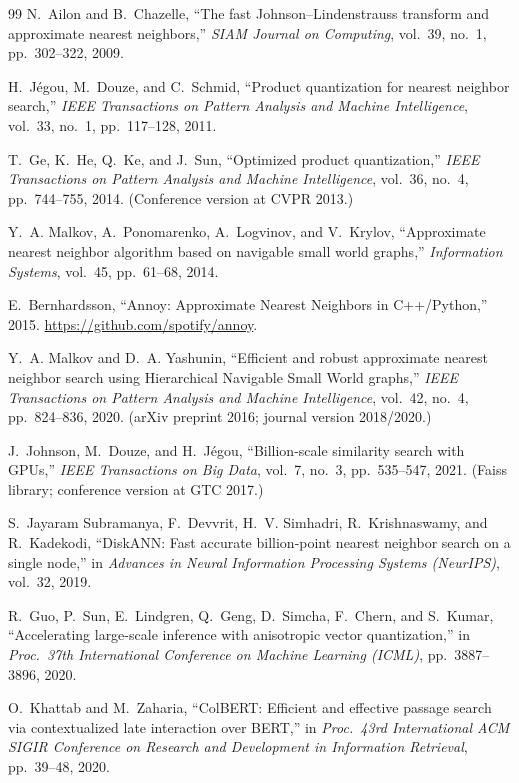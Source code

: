 \documentclass[11pt,a4paper]{article}
\theoremstyle{definition}
\begin{document}
\begin{thebibliography}{99}
N.~Ailon and B.~Chazelle,
``The fast Johnson--Lindenstrauss transform and approximate nearest neighbors,''
\emph{SIAM Journal on Computing}, vol.~39, no.~1, pp.~302--322, 2009.

H.~J\'egou, M.~Douze, and C.~Schmid,
``Product quantization for nearest neighbor search,''
\emph{IEEE Transactions on Pattern Analysis and Machine Intelligence},
vol.~33, no.~1, pp.~117--128, 2011.

T.~Ge, K.~He, Q.~Ke, and J.~Sun,
``Optimized product quantization,''
\emph{IEEE Transactions on Pattern Analysis and Machine Intelligence},
vol.~36, no.~4, pp.~744--755, 2014.
(Conference version at CVPR 2013.)

Y.~A. Malkov, A.~Ponomarenko, A.~Logvinov, and V.~Krylov,
``Approximate nearest neighbor algorithm based on navigable small world graphs,''
\emph{Information Systems}, vol.~45, pp.~61--68, 2014.

E.~Bernhardsson,
``Annoy: Approximate Nearest Neighbors in C++/Python,''
2015.
\url{https://github.com/spotify/annoy}.

Y.~A. Malkov and D.~A. Yashunin,
``Efficient and robust approximate nearest neighbor search using
Hierarchical Navigable Small World graphs,''
\emph{IEEE Transactions on Pattern Analysis and Machine Intelligence},
vol.~42, no.~4, pp.~824--836, 2020.
(arXiv preprint 2016; journal version 2018/2020.)

J.~Johnson, M.~Douze, and H.~J\'egou,
``Billion-scale similarity search with GPUs,''
\emph{IEEE Transactions on Big Data}, vol.~7, no.~3, pp.~535--547, 2021.
(Faiss library; conference version at GTC 2017.)

S.~Jayaram Subramanya, F.~Devvrit, H.~V. Simhadri, R.~Krishnaswamy,
and R.~Kadekodi,
``DiskANN: Fast accurate billion-point nearest neighbor search on a single node,''
in \emph{Advances in Neural Information Processing Systems (NeurIPS)},
vol.~32, 2019.

R.~Guo, P.~Sun, E.~Lindgren, Q.~Geng, D.~Simcha, F.~Chern, and S.~Kumar,
``Accelerating large-scale inference with anisotropic vector quantization,''
in \emph{Proc.\ 37th International Conference on Machine Learning (ICML)},
pp.~3887--3896, 2020.

O.~Khattab and M.~Zaharia,
``ColBERT: Efficient and effective passage search via contextualized late
interaction over BERT,''
in \emph{Proc.\ 43rd International ACM SIGIR Conference on Research and
Development in Information Retrieval}, pp.~39--48, 2020.


\end{thebibliography}
\end{document}
